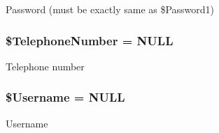 Password (must be exactly same as \$\-Password1) \hypertarget{verifyaccount_script_8php_ad11bcebff6fcabeb70318242dc26eab5}{
\subsubsection[{\$\-Telephone\-Number}]{\setlength{\rightskip}{0pt plus 5cm}\$Telephone\-Number = N\-U\-L\-L}}\label{verifyaccount_script_8php_ad11bcebff6fcabeb70318242dc26eab5}
Telephone number \hypertarget{verifyaccount_script_8php_a0e2ea0d42b9b800eb5bf8660587f5f7f}{
\subsubsection[{\$\-Username}]{\setlength{\rightskip}{0pt plus 5cm}\$Username = N\-U\-L\-L}}\label{verifyaccount_script_8php_a0e2ea0d42b9b800eb5bf8660587f5f7f}
Username 